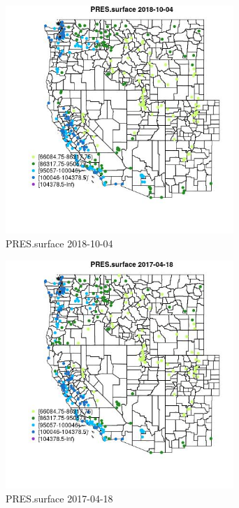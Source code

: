 \begin{figure} 
\centering  
\includegraphics[width=0.77\textwidth]{Code_Outputs/Report_ML_input_PM25_Step4_part_f_de_duplicated_aves_prioritize_24hr_obswNAs_MapObsPRESsurface2018-10-04.jpg} 
\caption{\label{fig:Report_ML_input_PM25_Step4_part_f_de_duplicated_aves_prioritize_24hr_obswNAsMapObsPRESsurface2018-10-04}PRES.surface 2018-10-04} 
\end{figure} 
 

\begin{figure} 
\centering  
\includegraphics[width=0.77\textwidth]{Code_Outputs/Report_ML_input_PM25_Step4_part_f_de_duplicated_aves_prioritize_24hr_obswNAs_MapObsPRESsurface2017-04-18.jpg} 
\caption{\label{fig:Report_ML_input_PM25_Step4_part_f_de_duplicated_aves_prioritize_24hr_obswNAsMapObsPRESsurface2017-04-18}PRES.surface 2017-04-18} 
\end{figure} 
 

